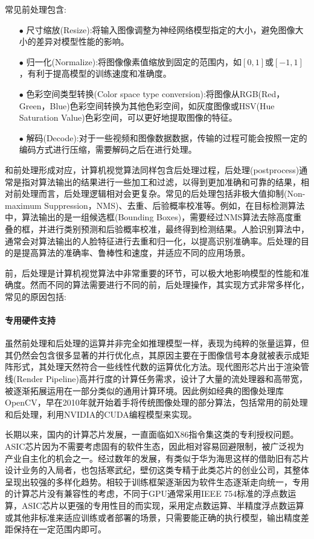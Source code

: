 \documentclass[master]{shtthesis}
\begin{document}
常见前处理包含:
\begin{itemize}
	\item[$\bullet$]尺寸缩放(Resize):将输入图像调整为神经网络模型指定的大小，避免图像大小的差异对模型性能的影响。
	\item[$\bullet$]归一化(Normalize):将图像像素值缩放到固定的范围内，如$[0,1]$或$[-1,1]$，有利于提高模型的训练速度和准确度。
	\item[$\bullet$]色彩空间类型转换(Color space type conversion):将图像从RGB(Red，Green，Blue)色彩空间转换为其他色彩空间，如灰度图像或HSV(Hue Saturation Value)色彩空间，可以更好地提取图像的特征。
	\item[$\bullet$]解码(Decode):对于一些视频和图像数据数据，传输的过程可能会按照一定的编码方式进行压缩，需要解码之后在进行处理。
\end{itemize}
和前处理形成对应，计算机视觉算法同样包含后处理过程，后处理(postprocess)通常是指对算法输出的结果进行一些加工和过滤，以得到更加准确和可靠的结果，相对前处理而言，后处理逻辑相对会更复杂。常见的后处理包括非极大值抑制(Non-maximum Suppression，NMS)\cite{bodla2017soft}、去重、后验概率校准等。例如，在目标检测算法中，算法输出的是一组候选框(Bounding Boxes)，需要经过NMS算法去除高度重叠的框，并进行类别预测和后验概率校准，最终得到检测结果。人脸识别算法中，通常会对算法输出的人脸特征进行去重和归一化，以提高识别准确率。后处理的目的是提高算法的准确率、鲁棒性和速度，并适应不同的应用场景。

前，后处理是计算机视觉算法中非常重要的环节，可以极大地影响模型的性能和准确度。然而不同的算法需要进行不同的前，后处理操作，其实现方式非常多样化，常见的原因包括:
\paragraph{专用硬件支持}虽然前处理和后处理的运算并非完全如推理模型一样，表现为纯粹的张量运算，但其仍然会包含很多显著的并行优化点，其原因主要在于图像信号本身就被表示成矩阵形式，其处理天然符合一些线性代数的运算优化方法。现代图形芯片出于渲染管线(Render Pipeline)高并行度的计算任务需求，设计了大量的流处理器和高带宽，被逐渐拓展运用在一部分类似的通用计算环境。因此例如经典的图像处理库OpenCV\cite{bradski2000opencv}，早在2010年就开始着手将传统图像处理的部分算法，包括常用的前处理和后处理，利用NVIDIA的CUDA\cite{sanders2010cuda}编程模型来实现。

长期以来，国内的计算芯片发展，一直面临如X86指令集这类的专利授权问题。ASIC芯片因为不需要考虑固有的软件生态，因此相对容易回避限制，被广泛视为产业自主化的机会之一。经过数年的发展，有类似于华为海思这样的借助旧有芯片设计业务的入局者，也包括寒武纪，壁仞这类专精于此类芯片的创业公司，其整体呈现出较强的多样化趋势。相较于训练框架逐渐因为软件生态逐渐走向统一，专用的计算芯片没有兼容性的考虑，不同于GPU通常采用IEEE 754标准的浮点数运算，ASIC芯片以更强的专用性目的而实现，采用定点数运算、半精度浮点数运算或其他非标准来适应训练或者部署的场景，只需要能正确的执行模型，输出精度差距保持在一定范围内即可。
\end{document}
